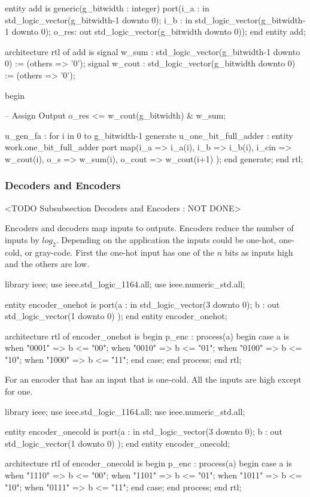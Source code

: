 \begin{VHDLlisting}[tabsize=8]
entity add is
generic(g_bitwidth : integer)
port(i_a  : in    std_logic_vector(g_bitwidth-1 downto 0);  
     i_b  : in    std_logic_vector(g_bitwidth-1 downto 0);  
	 o_res:   out std_logic_vector(g_bitwidth downto 0));
end entity add;

architecture rtl of add is 
	signal w_sum  : std_logic_vector(g_bitwidth-1 downto 0) := (others => '0'); 
	signal w_cout : std_logic_vector(g_bitwidth downto 0) := (others => '0');
	
begin 

	-- Assign Output 
	o_res <= w_cout(g_bitwidth) & w_sum; 
	
	u_gen_fa : for i in 0 to g_bitwidth-1 generate  
		u_one_bit_full_adder : entity work.one_bit_full_adder  
		port map(i_a    => i_a(i),
				 i_b    => i_b(i),
				 i_cin  => w_cout(i),
				 o_s    => w_sum(i),
				 o_cout => w_cout(i+1)
        );  
	end generate;
end rtl;
\end{VHDLlisting}


	
\subsubsection{Decoders and Encoders}
	<TODO Subsubsection  Decoders and Encoders : NOT DONE>
	
Encoders and decoders map inputs to outputs. Encoders reduce the number of inputs by $log_2$. Depending on the application the inputs could be one-hot, one-cold, or gray-code. First the one-hot input has one of the $n$ bits as inputs high and the others are low.

\begin{VHDLlisting}[tabsize=8]
library ieee;
  use ieee.std_logic_1164.all;
  use ieee.numeric_std.all;
  
entity encoder_onehot is
port(a : in    std_logic_vector(3 downto 0);
     b :   out std_logic_vector(1 downto 0)
);
end entity encoder_onehot;

architecture rtl of encoder_onehot is
begin
	p_enc : process(a)
	begin
		case a is	
			when "0001" => 
				b <= "00";
			when "0010" => 
				b <= "01";
			when "0100" => 
				b <= "10";
			when "1000" => 
				b <= "11";
		end case;
	end process;
end rtl;
\end{VHDLlisting}

For an encoder that has an input that is one-cold. All the inputs are high except for one. 

\begin{VHDLlisting}[tabsize=8]
library ieee;
  use ieee.std_logic_1164.all;
  use ieee.numeric_std.all;
  
entity encoder_onecold is
port(a : in    std_logic_vector(3 downto 0);
     b :   out std_logic_vector(1 downto 0)
);
end entity encoder_onecold;

architecture rtl of encoder_onecold is
begin
	p_enc : process(a)
	begin
		case a is	
			when "1110" => 
				b <= "00";
			when "1101" => 
				b <= "01";
			when "1011" => 
				b <= "10";
			when "0111" => 
				b <= "11";
		end case;
	end process;
end rtl;
\end{VHDLlisting}
	
